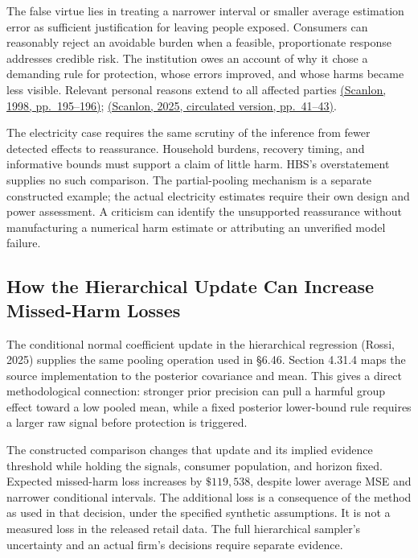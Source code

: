 The false virtue lies in treating a narrower interval or smaller average
estimation error as sufficient justification for leaving people exposed.
Consumers can reasonably reject an avoidable burden when a feasible,
proportionate response addresses credible risk. The institution owes an
account of why it chose a demanding rule for protection, whose errors
improved, and whose harms became less visible. Relevant personal reasons
extend to all affected parties
\href{https://e-edu.nbu.bg/pluginfile.php/314831/mod_resource/content/0/scanlon_5.1-3.pdf}{(Scanlon,
1998, pp.~195--196)};
\href{https://www.law.nyu.edu/sites/default/files/2025-09/T.\%20M.\%20Scanlon\%2C\%20Contractualism\%20and\%20Intuitionism.pdf}{(Scanlon,
2025, circulated version, pp.~41--43)}.

The electricity case requires the same scrutiny of the inference from
fewer detected effects to reassurance. Household burdens, recovery
timing, and informative bounds must support a claim of little harm.
HBS's overstatement supplies no such comparison. The partial-pooling
mechanism is a separate constructed example; the actual electricity
estimates require their own design and power assessment. A criticism can
identify the unsupported reassurance without manufacturing a numerical
harm estimate or attributing an unverified model failure.

\hypertarget{M09-how-the-hierarchical-update-can-increase-missed-harm-losses}{%
\subsection{How the Hierarchical Update Can Increase Missed-Harm
Losses}\label{M09-how-the-hierarchical-update-can-increase-missed-harm-losses}}

\noindent \noindent The conditional normal coefficient update in the hierarchical
regression (Rossi, 2025) supplies the same pooling operation used in
§6.46. Section 4.31.4 maps the source implementation to the posterior
covariance and mean. This gives a direct methodological connection:
stronger prior precision can pull a harmful group effect toward a low
pooled mean, while a fixed posterior lower-bound rule requires a larger
raw signal before protection is triggered.

The constructed comparison changes that update and its implied evidence
threshold while holding the signals, consumer population, and horizon
fixed. Expected missed-harm loss increases by \(\$119{,}538\), despite
lower average MSE and narrower conditional intervals. The additional
loss is a consequence of the method as used in that decision, under the
specified synthetic assumptions. It is not a measured loss in the
released retail data. The full hierarchical sampler's uncertainty and an
actual firm's decisions require separate evidence.

